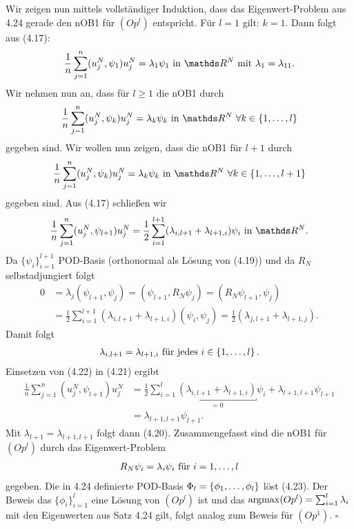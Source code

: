 Wir zeigen nun mittels vollständiger Induktion, dass das Eigenwert-Problem aus 4.24 gerade den nOB1 für $(Op^l)$ entspricht.
Für $l=1$ gilt: $k=1$. 
Dann folgt aus (4.17):
\[
\frac{1}{n} \sum_{j=1}^n (u_j^N,\psi_1) u_j^N = \lambda_1\psi_1 \text{ in } \R^N \text{ mit } \lambda_1 =\lambda_{11}.
\]
Wir nehmen nun an, dass für $l\ge 1$ die nOB1 durch
\begin{align}
\frac{1}{n} \sum_{j=1}^n (u_j^N,\psi_k) u_j^N = \lambda_k\psi_k \text{ in } \R^N ~\forall k\in\{1\dt{,}l\}
\end{align}
gegeben sind.
Wir wollen nun zeigen, dass die nOB1 für $l+1$ durch
\begin{align}
\frac{1}{n} \sum_{j=1}^n (u_j^N,\psi_k) u_j^N = \lambda_k\psi_k \text{ in } \R^N ~\forall k\in\{1\dt{,}l+1\}
\end{align}
gegeben sind.
Aus (4.17) schließen wir
\begin{align}
\frac{1}{n} \sum_{j=1}^n (u_j^N,\psi_{l+1}) u_j^N = \frac{1}{2} \sum_{i=1}^{l+1} (\lambda_{i,l+1}+\lambda_{l+1,i})\psi_i \text{ in } \R^N.
\end{align}
Da $\{\psi_i\}_{i=1}^{l+1}$ POD-Basis (orthonormal als Lösung von (4.19)) und da $R_N$ selbstadjungiert folgt
\begin{align*}
0 &= \lambda_j(\psi_{l+1},\psi_j) = (\psi_{l+1},R_N\psi_j) = (R_N\psi_{l+1},\psi_j)\\
&= \frac{1}{2} \sum_{i=1}^{l+1} (\lambda_{i,l+1}+\lambda_{l+1,i}) (\psi_i,\psi_j) = \frac{1}{2} (\lambda_{j,l+1}+\lambda_{l+1,j}).
\end{align*}
Damit folgt
\begin{align}
\lambda_{i,l+1} = \lambda_{l+1,i} \text{ für jedes } i\in\left\{1, \dots ,l\right\}.
\end{align}
Einsetzen von (4.22) in (4.21) ergibt
\begin{align*}
\frac{1}{n} \sum_{j=1}^n (u_j^N,\psi_{l+1}) u_j^N &= \frac{1}{2} \sum_{i=1}^{l} \underbracket{(\lambda_{i,l+1}+\lambda_{l+1,i})}_{=0}\psi_i + \lambda_{l+1,l+1}\psi_{l+1}\\
&= \lambda_{l+1,l+1}\psi_{l+1}.
\end{align*}
Mit $\lambda_{l+1}=\lambda_{l+1,l+1}$ folgt dann (4.20).
Zusammengefasst sind die nOB1 für $(Op^l)$ durch das Eigenwert-Problem
\begin{align}
R_N\psi_i = \lambda_i\psi_i \text{ für } i=1, \dots ,l
\end{align}
gegeben.
Die in 4.24 definierte POD-Basis $\Phi_l=\left\{\phi_1, \dots ,\phi_l\right\}$ löst (4.23).
Der Beweis das $\{\phi_i\}_{i=1}^l$ eine Lösung von $(Op^l)$ ist und das $\operatorname{argmax} (Op^l)=\sum_{i=1}^l \lambda_i$ mit den Eigenwerten aus Satz 4.24 gilt, folgt analog zum Beweis für $(Op^1)$.
\hfill $\square$

